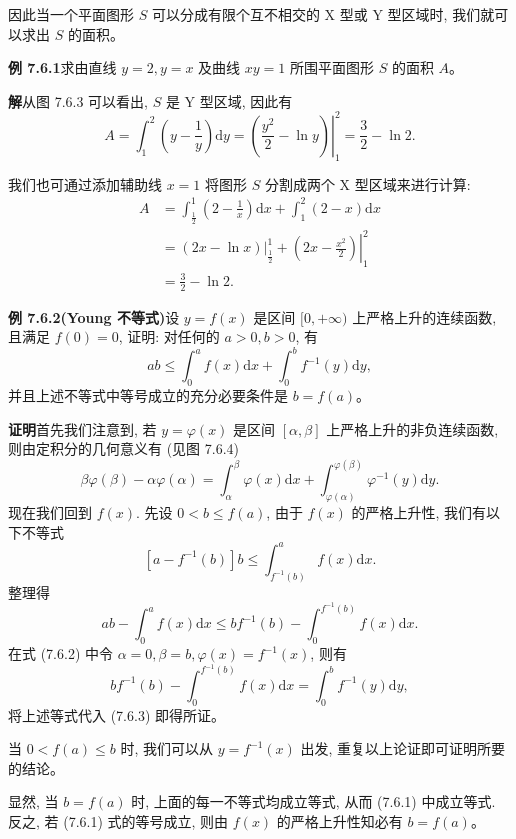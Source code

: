 \documentclass[UTF8, 12pt, fontset=fandol, oneside]{ctexart}
\begin{document}
因此当一个平面图形 $S$ 可以分成有限个互不相交的 X 型或 Y 型区域时, 我们就可以求出 $S$ 的面积。

\noindent\textbf{例 7.6.1}\quad 求由直线 $y=2,y=x$ 及曲线 $xy=1$ 所围平面图形 $S$ 的面积 $A$。

\noindent\textbf{解}\quad 从图 7.6.3 可以看出, $S$ 是 Y 型区域, 因此有
\[
  A=\int_1^2\left(y-\frac{1}{y}\right)\mathrm dy
  =\left.\left(\frac{y^2}{2}-\ln y\right)\right|_1^2
  =\frac{3}{2}-\ln2.
\]

我们也可通过添加辅助线 $x=1$ 将图形 $S$ 分割成两个 X 型区域来进行计算:
\[
\begin{aligned}
  A&=\int_{\frac12}^1\left(2-\frac{1}{x}\right)\mathrm dx+\int_1^2(2-x)\mathrm dx\\
  &=\left.(2x-\ln x)\right|_{\frac12}^1
  +\left.\left(2x-\frac{x^2}{2}\right)\right|_1^2\\
  &=\frac{3}{2}-\ln2.
\end{aligned}
\]

\noindent\textbf{例 7.6.2(Young 不等式)}\quad 设 $y=f(x)$ 是区间 $[0,+\infty)$ 上严格上升的连续函数, 且满足 $f(0)=0$, 证明: 对任何的 $a>0,b>0$, 有
\begin{equation}
  ab\leq\int_0^a f(x)\mathrm dx+\int_0^b f^{-1}(y)\mathrm dy,
  \tag{7.6.1}
\end{equation}
并且上述不等式中等号成立的充分必要条件是 $b=f(a)$。

\noindent\textbf{证明}\quad 首先我们注意到, 若 $y=\varphi(x)$ 是区间 $[\alpha,\beta]$ 上严格上升的非负连续函数, 则由定积分的几何意义有 (见图 7.6.4)
\begin{equation}
  \beta\varphi(\beta)-\alpha\varphi(\alpha)
  =\int_\alpha^\beta \varphi(x)\mathrm dx
  +\int_{\varphi(\alpha)}^{\varphi(\beta)}\varphi^{-1}(y)\mathrm dy.
  \tag{7.6.2}
\end{equation}
现在我们回到 $f(x)$. 先设 $0<b\leq f(a)$, 由于 $f(x)$ 的严格上升性, 我们有以下不等式
\[
  [a-f^{-1}(b)]b\leq\int_{f^{-1}(b)}^a f(x)\mathrm dx.
\]
整理得
\begin{equation}
  ab-\int_0^a f(x)\mathrm dx
  \leq bf^{-1}(b)-\int_0^{f^{-1}(b)}f(x)\mathrm dx.
  \tag{7.6.3}
\end{equation}
在式 (7.6.2) 中令 $\alpha=0,\beta=b,\varphi(x)=f^{-1}(x)$, 则有
\[
  bf^{-1}(b)-\int_0^{f^{-1}(b)}f(x)\mathrm dx
  =\int_0^b f^{-1}(y)\mathrm dy,
\]
将上述等式代入 (7.6.3) 即得所证。

当 $0<f(a)\leq b$ 时, 我们可以从 $y=f^{-1}(x)$ 出发, 重复以上论证即可证明所要的结论。

显然, 当 $b=f(a)$ 时, 上面的每一不等式均成立等式, 从而 (7.6.1) 中成立等式. 反之, 若 (7.6.1) 式的等号成立, 则由 $f(x)$ 的严格上升性知必有 $b=f(a)$。
\end{document}
